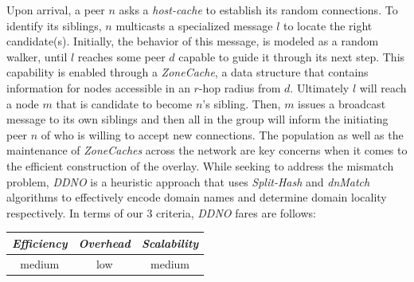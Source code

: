 Upon arrival, a peer $n$ asks a \emph{host-cache} to establish its
random connections. 
To identify its siblings, $n$ multicasts a specialized message $l$ 
to locate the right candidate(s).
Initially, the behavior of this message, is modeled as a random walker,
until $l$ reaches some peer $d$ capable to guide it through its next step.
This capability is enabled through a \emph{ZoneCache}, a data structure that
contains information for nodes accessible in an $r$-hop radius from $d$.
Ultimately $l$ will reach a node $m$ that is candidate to become $n$'s sibling. 
Then, $m$ issues a broadcast message to its own siblings and then all in the group will
inform the initiating peer $n$ of who is willing to accept new connections.
The population as well as the maintenance of \emph{ZoneCaches} across the network
are key concerns when it comes to the efficient construction of the overlay.
While seeking to address the mismatch problem, 
\emph{DDNO} is a heuristic approach that uses
\emph{Split-Hash} and \emph{dnMatch} algorithms to effectively encode domain
names and determine domain locality respectively. 
In terms of our $3$ criteria, \emph{DDNO} fares are follows:
\begin{center}
{\footnotesize
\begin{tabular}{ccc}
\emph{Efficiency} & \emph{Overhead} & \emph{Scalability} \\
\hline
medium &
low &
medium
\end{tabular}
}
\end{center}

